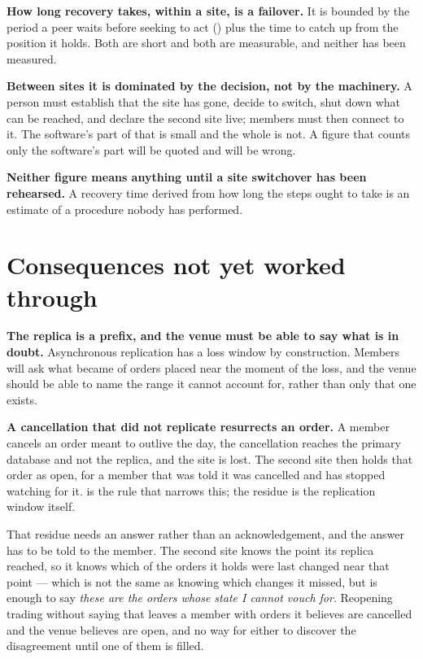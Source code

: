 \textbf{How long recovery takes, within a site, is a failover.} It is bounded by
the period a peer waits before seeking to act () plus the time to
catch up from the position it holds. Both are short and both are measurable, and
neither has been measured.

\textbf{Between sites it is dominated by the decision, not by the machinery.}
A person must establish that the site has gone, decide to switch, shut down what
can be reached, and declare the second site live; members must then connect to
it. The software's part of that is small and the whole is not. A figure that
counts only the software's part will be quoted and will be wrong.

\textbf{Neither figure means anything until a site switchover has been
rehearsed.} A recovery time derived from how long the steps ought to take is an
estimate of a procedure nobody has performed.

\section{Consequences not yet worked through}
\label{sec:dr:open}

\textbf{The replica is a prefix, and the venue must be able to say what is in
doubt.} Asynchronous replication has a loss window by construction. Members will
ask what became of orders placed near the moment of the loss, and the venue
should be able to name the range it cannot account for, rather than only that one
exists.

\textbf{A cancellation that did not replicate resurrects an order.} A member
cancels an order meant to outlive the day, the cancellation reaches the primary
database and not the replica, and the site is lost. The second site then holds
that order as open, for a member that was told it was cancelled and has stopped
watching for it.  is the rule that narrows this; the residue is
the replication window itself.

That residue needs an answer rather than an acknowledgement, and the answer has
to be told to the member. The second site knows the point its replica reached,
so it knows which of the orders it holds were last changed near that point ---
which is not the same as knowing which changes it missed, but is enough to say
\emph{these are the orders whose state I cannot vouch for}. Reopening trading
without saying that leaves a member with orders it believes are cancelled and
the venue believes are open, and no way for either to discover the disagreement
until one of them is filled.

